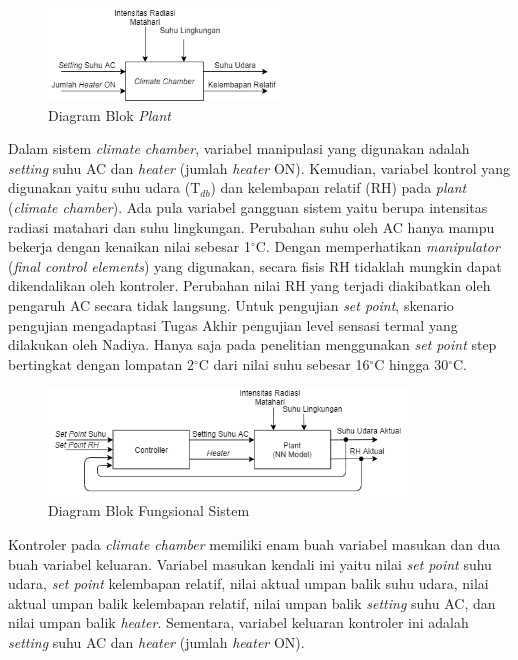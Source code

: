 \begin{figure}[!h]
	\centering
	\includegraphics[width=0.55\textwidth]{figures/BlokDiagramPlant}
	\caption{Diagram Blok \textit{Plant}}
	\label{fig:5:DiagramBlokPlant}
\end{figure}
\vspace{1em}

Dalam sistem \textit{climate chamber}, variabel manipulasi yang digunakan adalah \textit{setting} suhu AC dan \textit{heater} (jumlah \textit{heater} ON). Kemudian, variabel kontrol yang digunakan yaitu suhu udara (T$_{db}$) dan kelembapan relatif (RH) pada \textit{plant} (\textit{climate chamber}). Ada pula variabel gangguan sistem yaitu berupa intensitas radiasi matahari dan suhu lingkungan. Perubahan suhu oleh AC hanya mampu bekerja dengan kenaikan nilai sebesar 1$^\circ$C. Dengan memperhatikan \textit{manipulator} (\textit{final control elements}) yang digunakan, secara fisis RH tidaklah mungkin dapat dikendalikan oleh kontroler. Perubahan nilai RH yang terjadi diakibatkan oleh pengaruh AC secara tidak langsung. Untuk pengujian \textit{set point}, skenario pengujian mengadaptasi Tugas Akhir pengujian level sensasi termal yang dilakukan oleh Nadiya\cite{skripsiMuna}. Hanya saja pada penelitian menggunakan \textit{set point} step bertingkat dengan lompatan 2$^{\circ}$C dari nilai suhu sebesar 16$^{\circ}$C hingga 30$^{\circ}$C.

\begin{figure}[!h]
	\centering
	\includegraphics[width=0.85\textwidth]{figures/DiagramBlokFungsionalSistem}
	\caption{Diagram Blok Fungsional Sistem}
	\label{fig:5:DiagramBlokSistem}
\end{figure}

Kontroler pada \textit{climate chamber} memiliki enam buah variabel masukan dan dua buah variabel keluaran. Variabel masukan kendali ini yaitu nilai \textit{set point} suhu udara, \textit{set point} kelembapan relatif, nilai aktual umpan balik suhu udara, nilai aktual umpan balik kelembapan relatif, nilai umpan balik \textit{setting} suhu AC, dan nilai umpan balik \textit{heater}. Sementara, variabel keluaran kontroler ini adalah \textit{setting} suhu AC dan \textit{heater} (jumlah \textit{heater} ON).

